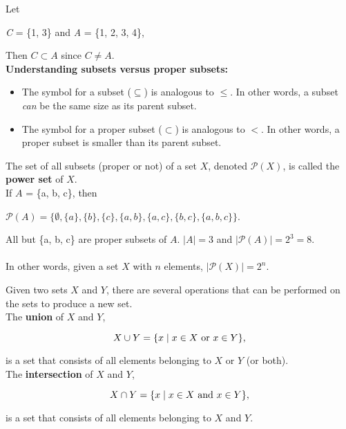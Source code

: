 Let

\begin{center}
\textit{C} = \{1, 3\} and \textit{A} = \{1, 2, 3, 4\},
\end{center}

Then $C \subset A$ since $C \neq A$.\\

\textbf{Understanding subsets versus proper subsets:}

\begin{itemize}
\item The symbol for a subset ($\subseteq$) is analogous to $\leq$.  In other words, a subset \textit{can} be the same size as its parent subset.
\item The symbol for a proper subset ($\subset$) is analogous to $<$.  In other words, a proper subset is smaller than its parent subset.
\end{itemize}

The set of all subsets (proper or not) of a set $X$, denoted $\mathcal{P}(X)$, is called the \textbf{power set} of 
$X$.\\

If $A$ = \{a, b, c\}, then

\begin{center}
$\mathcal{P}(A) = \{\emptyset, \{a\}, \{b\}, \{c\}, \{a, b\}, \{a, c\}, \{b, c\}, \{a, b, c\}\}$.
\end{center}

All but \{a, b, c\} are proper subsets of $A$. $|A| = 3$ and $|\mathcal{P}(A)| = 2^3 = 8$.\\\\
In other words, given a set $X$ with $n$ elements, $|\mathcal{P}(X)| = 2^n$. 
\clearpage

Given two sets $X$ and $Y$, there are several operations that can be performed on the sets to produce a new set.\\

The \textbf{union} of $X$ and $Y$,

\[
    X \cup Y = \{x \mid x \in X \text{ or } x \in Y\},
\]

is a set that consists of all elements belonging to $X$ or $Y$ (or both).\\

The \textbf{intersection} of $X$ and $Y$,

\[
    X \cap Y = \{x \mid x \in X \text{ and } x \in Y\},
\]

is a set that consists of all elements belonging to $X$ and $Y$.\\

